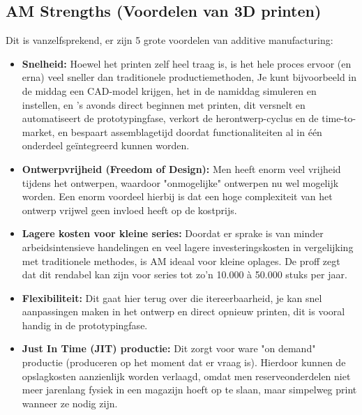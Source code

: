 \subsection{AM Strengths (Voordelen van 3D printen)}
Dit is vanzelfsprekend, er zijn 5 grote voordelen van additive manufacturing:
\begin{itemize}
  \item \textbf{Snelheid:} Hoewel het printen zelf heel traag is, is het hele proces ervoor (en erna) veel sneller dan traditionele productiemethoden, Je kunt bijvoorbeeld in de middag een CAD-model krijgen, het in de namiddag simuleren en instellen, en 's avonds direct beginnen met printen, dit versnelt en automatiseert de prototypingfase, verkort de herontwerp-cyclus en de time-to-market, en bespaart assemblagetijd doordat functionaliteiten al in één onderdeel geïntegreerd kunnen worden.
  \item \textbf{Ontwerpvrijheid (Freedom of Design):} Men heeft enorm veel vrijheid tijdens het ontwerpen, waardoor "onmogelijke" ontwerpen nu wel mogelijk worden. Een enorm voordeel hierbij is dat een hoge complexiteit van het ontwerp vrijwel geen invloed heeft op de kostprijs.
  \item \textbf{Lagere kosten voor kleine series:} Doordat er sprake is van minder arbeidsintensieve handelingen en veel lagere investeringskosten in vergelijking met traditionele methodes, is AM ideaal voor kleine oplages. De proff zegt dat dit rendabel kan zijn voor series tot zo'n 10.000 à 50.000 stuks per jaar.
  \item \textbf{Flexibiliteit:} Dit gaat hier terug over die itereerbaarheid, je kan snel aanpassingen maken in het ontwerp en direct opnieuw printen, dit is vooral handig in de prototypingfase.
  \item \textbf{Just In Time (JIT) productie:} Dit zorgt voor ware "on demand" productie (produceren op het moment dat er vraag is). Hierdoor kunnen de opslagkosten aanzienlijk worden verlaagd, omdat men reserveonderdelen niet meer jarenlang fysiek in een magazijn hoeft op te slaan, maar simpelweg print wanneer ze nodig zijn.
\end{itemize}
